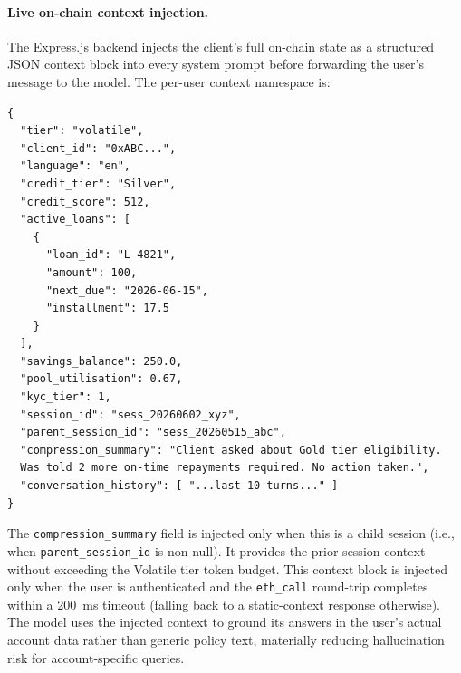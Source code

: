 \documentclass[12pt,a4paper]{report}
\begin{document}
\paragraph{Live on-chain context injection.}
The Express.js backend injects the client's full on-chain state as a structured JSON context block into every system prompt before forwarding the user's message to the model. The per-user context namespace is:
\begin{verbatim}
{
  "tier": "volatile",
  "client_id": "0xABC...",
  "language": "en",
  "credit_tier": "Silver",
  "credit_score": 512,
  "active_loans": [
    {
      "loan_id": "L-4821",
      "amount": 100,
      "next_due": "2026-06-15",
      "installment": 17.5
    }
  ],
  "savings_balance": 250.0,
  "pool_utilisation": 0.67,
  "kyc_tier": 1,
  "session_id": "sess_20260602_xyz",
  "parent_session_id": "sess_20260515_abc",
  "compression_summary": "Client asked about Gold tier eligibility.
  Was told 2 more on-time repayments required. No action taken.",
  "conversation_history": [ "...last 10 turns..." ]
}
\end{verbatim}
The \texttt{compression\_summary} field is injected only when this is a child session (i.e., when \texttt{parent\_session\_id} is non-null). It provides the prior-session context without exceeding the Volatile tier token budget. This context block is injected only when the user is authenticated and the \texttt{eth\_call} round-trip completes within a 200~ms timeout (falling back to a static-context response otherwise). The model uses the injected context to ground its answers in the user's actual account data rather than generic policy text, materially reducing hallucination risk for account-specific queries.
\end{document}
